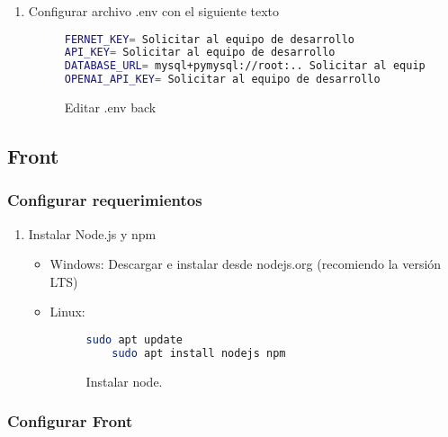 \begin{enumerate}
    \item Configurar archivo .env con el siguiente texto

    \begin{figure}
    \begin{lstlisting}[language=bash]
FERNET_KEY= Solicitar al equipo de desarrollo
API_KEY= Solicitar al equipo de desarrollo
DATABASE_URL= mysql+pymysql://root:.. Solicitar al equipo de desarrollo
OPENAI_API_KEY= Solicitar al equipo de desarrollo
\end{lstlisting}
\caption{Editar .env back}
\label{fig:env-back}
\end{figure}

\end{enumerate}

\subsection{Front}

\subsubsection*{Configurar requerimientos}
\begin{enumerate}
    \item Instalar Node.js y npm
    \begin{itemize}
        \item Windows: Descargar e instalar desde nodejs.org (recomiendo la versión LTS)
        \item Linux:

        \begin{figure}[H]
        \begin{lstlisting}[language=bash]
    sudo apt update
    sudo apt install nodejs npm
        \end{lstlisting}
        \caption{Instalar node.}
        \label{fig:Instalar-node}
        \end{figure}
    \end{itemize}
\end{enumerate}

\subsubsection*{Configurar Front}

